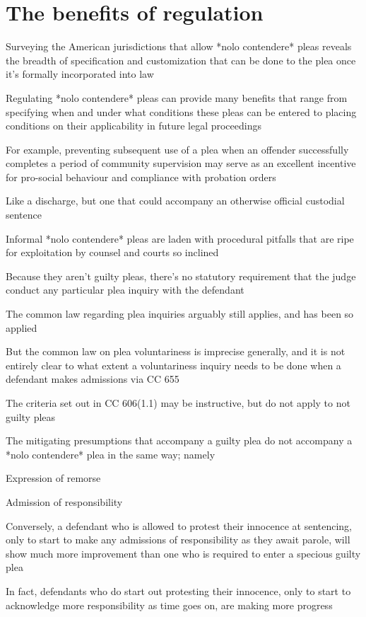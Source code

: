 \section{The benefits of regulation}

Surveying the American jurisdictions that allow *nolo contendere* pleas reveals the breadth of specification and customization that can be done to the plea once it's formally incorporated into law

Regulating *nolo contendere* pleas can provide many benefits that range from specifying when and under what conditions these pleas can be entered to placing conditions on their applicability in future legal proceedings

For example, preventing subsequent use of a plea when an offender successfully completes a period of community supervision may serve as an excellent incentive for pro-social behaviour and compliance with probation orders

Like a discharge, but one that could accompany an otherwise official custodial sentence

Informal *nolo contendere* pleas are laden with procedural pitfalls that are ripe for exploitation by counsel and courts so inclined

Because they aren't guilty pleas, there's no statutory requirement that the judge conduct any particular plea inquiry with the defendant

The common law regarding plea inquiries arguably still applies, and has been so applied

But the common law on plea voluntariness is imprecise generally, and it is not entirely clear to what extent a voluntariness inquiry needs to be done when a defendant makes admissions via CC 655

The criteria set out in CC 606(1.1) may be instructive, but do not apply to not guilty pleas

The mitigating presumptions that accompany a guilty plea do not accompany a *nolo contendere* plea in the same way; namely

Expression of remorse

Admission of responsibility

Conversely, a defendant who is allowed to protest their innocence at sentencing, only to start to make any admissions of responsibility as they await parole, will show much more improvement than one who is required to enter a specious guilty plea

In fact, defendants who do start out protesting their innocence, only to start to acknowledge more responsibility as time goes on, are making more progress

